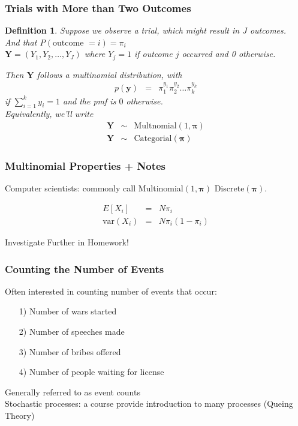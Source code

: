 \documentclass{beamer}
\newtheorem{defn}{Definition}
\numberwithin{equation}{section}
\begin{document}
\begin{frame}
\frametitle{Trials with More than Two Outcomes}


\begin{defn}
Suppose we observe a trial, which might result in $J$ outcomes.  \\
And that P$(\text{outcome } = i) = \pi_{i}$ \\
$\boldsymbol{Y} = (Y_{1}, Y_{2}, \hdots, Y_{J})$  where $Y_{j} = 1$ if outcome $j$ occurred and 0 otherwise. 

Then $\boldsymbol{Y}$ follows a \alert{multinomial} distribution, with \\
\begin{eqnarray}
p(\boldsymbol{y} ) & = & \pi_{1}^{y_{1}} \pi_{2}^{y_{2} } \hdots \pi_{k}^{y_{k}} \nonumber 
\end{eqnarray}
if $\sum_{i=1}^{k} y_{i} = 1$ and the pmf is $0$ otherwise.  \\
Equivalently, we'll write 
\begin{eqnarray}
\boldsymbol{Y} & \sim & \text{Multnomial}(1, \boldsymbol{\pi}) \nonumber \\
\boldsymbol{Y} & \sim & \text{Categorial}(\boldsymbol{\pi}) \nonumber 
\end{eqnarray}
\end{defn}
\end{frame}


\begin{frame}
\frametitle{Multinomial Properties + Notes}
Computer scientists: commonly call Multinomial$(1, \boldsymbol{\pi})$ \alert{Discrete}$(\boldsymbol{\pi})$. 

\begin{eqnarray}
E[X_{i} ] & = &  N \pi_{i} \nonumber \\
\text{var}(X_{i} ) & = &  N \pi_{i} (1- \pi_{i}) \nonumber 
\end{eqnarray}



\alert{Investigate Further in Homework!}


\end{frame}

\begin{frame}
\frametitle{Counting the Number of Events}

Often interested in counting number of events that occur:
\begin{itemize}
\item[1)] Number of wars started
\item[2)] Number of speeches made
\item[3)] Number of bribes offered
\item[4)] Number of people waiting for license
\end{itemize}

Generally referred to as \alert{event counts}\\
\alert{Stochastic processes}: a course provide introduction to many processes (\alert{Queing Theory})


\end{frame}
\end{document}
